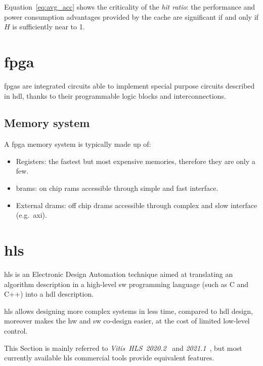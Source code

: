 \documentclass[11pt,a4paper,oneside]{memoir}
\begin{document}
Equation~\ref{eq:avg_acc} shows the criticality of the \emph{hit ratio}: the
performance and power consumption advantages provided by the cache are
significant if and only if $H$ is sufficiently near to 1.

\section{\acl{fpga}}
\aclp{fpga} are integrated circuits able to implement special purpose circuits
described in \ac{hdl}, thanks to their programmable logic blocks and
interconnections.
\subsection{Memory system}
A \ac{fpga} memory system is typically made up of:
\begin{itemize}
	\item Registers: the fastest but most expensive memories, therefore
		they are only a few.
	\item \acp{bram}: on chip \acp{ram} accessible through simple and fast
		interface.
	\item External \acp{dram}: off chip \acp{dram} accessible through
		complex and slow interface (e.g.\ \acs{axi}).
\end{itemize}

\section{\acl{hls}}
\acf{hls} is an Electronic Design Automation technique aimed at translating an
algorithm description in a high-level \acl{sw} programming language (such as C
and C++) into a \ac{hdl} description.

\ac{hls} allows designing more complex systems in less time, compared to
\ac{hdl} design, moreover makes the \acl{hw} and \acl{sw} co-design easier, at
the cost of limited low-level control.

This Section is mainly referred to
\emph{Vitis\texttrademark~HLS~2020.2}~\cite{vitisug202} and
\emph{2021.1}~\cite{vitisug211}, but most currently available \ac{hls}
commercial tools provide equivalent features.
\end{document}
